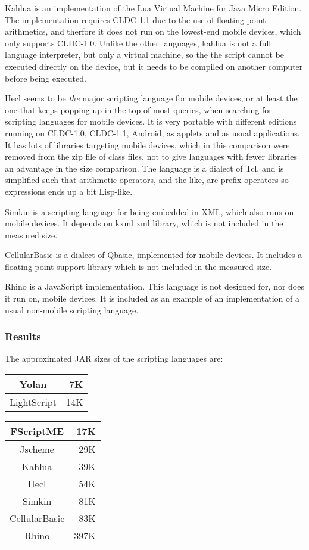 \documentclass[11pt]{report}
\begin{document}
Kahlua \cite{kahlua} is an implementation of the Lua Virtual Machine for Java Micro Edition. 
The implementation requires CLDC-1.1 due to the use of floating point arithmetics, and therfore it does not run on the lowest-end mobile devices, which only supports CLDC-1.0.
Unlike the other languages, kahlua is not a full language interpreter, but only a virtual machine, so the the script cannot be executed directly on the device, but it needs to be compiled on another computer before being executed.

Hecl \cite{hecl} seems to be \emph{the} major scripting language for mobile devices, or at least the one that keeps popping up in the top of most queries, when searching for scripting languages for mobile devices.
It is very portable with different editions running on CLDC-1.0, CLDC-1.1, Android, as applets and as usual applications.
It has lots of libraries targeting mobile devices, which in this comparison were removed from the zip file of class files, not to give languages with fewer libraries an advantage in the size comparison.
The language is a dialect of Tcl, and is simplified such that arithmetic operators, and the like, are prefix operators so expressions ends up a bit Lisp-like.

Simkin \cite{simkin} is a scripting language for being embedded in XML, which also runs on mobile devices. It depends on kxml xml library, which is not included in the measured size. 

CellularBasic \cite{cellularbasic} is a dialect of Qbasic, implemented for mobile devices. 
It includes a floating point support library which is not included in the measured size. 

Rhino \cite{rhino} is a JavaScript implementation. This language is not designed for, nor does it run on, mobile devices. It is included as an example of an implementation of a usual non-mobile scripting language.

\subsubsection{Results}
The approximated JAR sizes of the scripting languages are:
\begin{center}
\begin{tabular}{|c|r|} \hline 
Yolan & 7K \\ \hline 
LightScript & 14K \\ \hline 
\end{tabular}
\begin{tabular}{|c|r|} \hline 
FScriptME & 17K \\ \hline 
Jscheme & 29K \\ \hline 
Kahlua & 39K \\ \hline 
Hecl & 54K \\ \hline 
Simkin & 81K \\ \hline 
CellularBasic & 83K \\ \hline 
Rhino & 397K \\ \hline 
\end{tabular}
\end{center}
\end{document}

